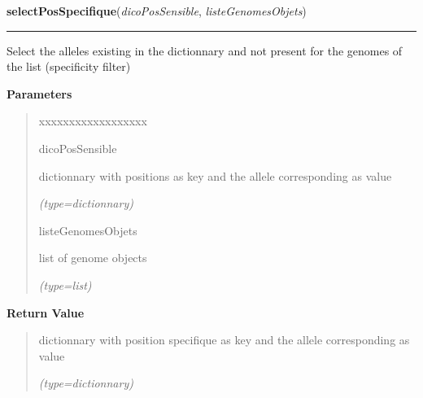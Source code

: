 \hspace{.8\funcindent}\begin{boxedminipage}{\funcwidth}

    \raggedright \textbf{selectPosSpecifique}(\textit{dicoPosSensible}, \textit{listeGenomesObjets})

    \vspace{-1.5ex}

    \rule{\textwidth}{0.5\fboxrule}
\setlength{\parskip}{2ex}
    Select the alleles existing in the dictionnary and not present for the 
    genomes of the list (specificity filter)

\setlength{\parskip}{1ex}
      \textbf{Parameters}
      \vspace{-1ex}

      \begin{quote}
        \begin{Ventry}{xxxxxxxxxxxxxxxxxx}

          \item[dicoPosSensible]

          dictionnary with positions as key and the allele corresponding as
          value

            {\it (type=dictionnary)}

          \item[listeGenomesObjets]

          list of genome objects

            {\it (type=list)}

        \end{Ventry}

      \end{quote}

      \textbf{Return Value}
    \vspace{-1ex}

      \begin{quote}
      dictionnary with position specifique as key and the allele 
      corresponding as value

      {\it (type=dictionnary)}

      \end{quote}

    \end{boxedminipage}

    \label{script-FixedVar:fileToList}

    \vspace{0.5ex}

